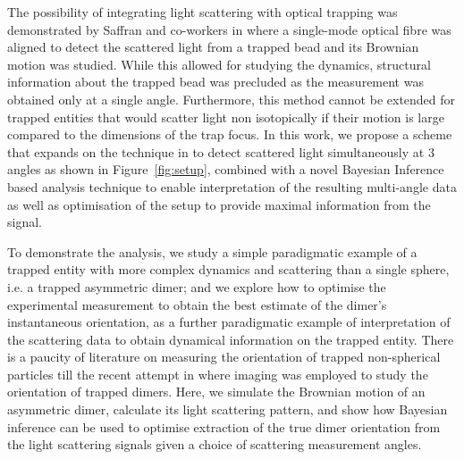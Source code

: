\documentclass[final, 3p]{elsarticle}
\begin{document}
The possibility of integrating light scattering with optical trapping was demonstrated by Saffran and co-workers in \cite{Bar-Ziv_1998} where a single-mode optical fibre was aligned to detect the scattered light from a trapped bead and its Brownian motion was studied. While this allowed for studying the dynamics, structural information about the trapped bead was precluded as the measurement was obtained only at a single angle. Furthermore, this method cannot be extended for trapped entities that would scatter light non isotopically if their motion is large compared to the dimensions of the trap focus. In this work, we propose a scheme that expands on the technique in \cite{Bar-Ziv_1998} to detect scattered light simultaneously at 3 angles as shown in Figure~\ref{fig:setup}, combined with a novel Bayesian Inference based analysis technique to enable interpretation of the resulting multi-angle data as well as optimisation of the setup to provide maximal information from the signal. 

To demonstrate the analysis, we study a simple paradigmatic example of a trapped entity with more complex dynamics and scattering than a single sphere, i.e. a trapped asymmetric dimer; and we explore how to optimise the experimental measurement to obtain the best estimate of the dimer's instantaneous orientation, as a further paradigmatic example of interpretation of the scattering data to obtain dynamical information on the trapped entity. There is a paucity of literature on measuring the orientation of trapped non-spherical particles till the recent attempt in \cite{raudsepp2022estimating} where imaging was employed to study the orientation of trapped dimers. Here, we simulate the Brownian motion of an asymmetric dimer, calculate its light scattering pattern, and show how Bayesian inference can be used to optimise extraction of the true dimer orientation from the light scattering signals given a choice of scattering measurement angles. 
\end{document}
